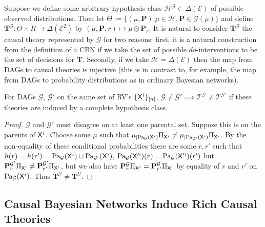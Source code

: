 Suppose we define some arbitrary hypothesis class $\mathscr{H}^{\mathcal{G}}\subset\Delta(\mathcal{E})$ of possible observed distributions. Then let $\Theta:=\{(\mu,\mathbf{P})|\mu\in\mathscr{H},\mathbf{P}\in \mathcal{G}(\mu)\}$ and define $\mathbf{T}^\mathscr{G}:\Theta\times R \to \Delta(\mathcal{E}^2)$ by $(\mu,\mathbf{P},r)\mapsto \mu\otimes \mathbf{P}_r$. It is natural to consider $\mathbf{T}^\mathscr{G}$ the causal theory represented by $\mathcal{G}$ for two reasons: first, it is a natural construction from the definition of a CBN if we take the set of possible $do$-interventions to be the set of decisions for $\mathbf{T}$. Secondly, if we take $\mathscr{H}=\Delta(\mathcal{E})$ then the map from DAGs to causal theories is injective (this is in contrast to, for example, the map from DAGs to probability distributions as in ordinary Bayesian networks\citep{bishop_pattern_2006}).

\begin{theorem}
For DAGs $\mathcal{G}$, $\mathcal{G}'$ on the same set of RV's $\{\mathsf{X}^i\}_{[n]}$, $\mathcal{G}\neq \mathcal{G}'\implies \mathscr{T}^{\mathcal{G}}\neq \mathscr{T}^{\mathcal{G}'}$ if these theories are induced by a complete hypothesis class.
\end{theorem}

\begin{proof}
$\mathcal{G}$ and $\mathcal{G}'$ must disagree on at least one parental set. Suppose this is on the parents of $\mathsf{X}^i$. Choose some $\mu$ such that $\mu_{|\text{Pa}_{\mathcal{G}}(\mathsf{X}^i)}\Pi_{\mathsf{X}^i} \neq  \mu_{|\text{Pa}_{\mathcal{G}'}(\mathsf{X}^i)}\Pi_{\mathsf{X}^i}$. By the non-equality of these conditional probabilities there are some $r,r'$ such that $h(r) = h(r') = \text{Pa}_{\mathcal{G}}(\mathsf{X}^i)\cup \text{Pa}_{\mathcal{G}'}(\mathsf{X}^i)$, $\text{Pa}_{\mathcal{G}}(\mathsf{X}'^i)(r) = \text{Pa}_{\mathcal{G}}(\mathsf{X}'^i)(r')$ but $\mathbf{P}^{\mathcal{G}'}_r \Pi_{\mathsf{X}^i} \neq \mathbf{P}^{\mathcal{G}'}_{r'} \Pi_{\mathsf{X}^i}$, but we also have $\mathbf{P}^{\mathcal{G}}_r \Pi_{\mathsf{X}^i} = \mathbf{P}^{\mathcal{G}}_{r'} \Pi_{\mathsf{X}^i}$ by equality of $r$ and $r'$ on $\text{Pa}_{\mathcal{G}}(\mathsf{X}^i)$. Thus $\mathbf{T}^\mathcal{G}\neq \mathbf{T}^\mathcal{G}$.
\end{proof}

\subsection{Causal Bayesian Networks Induce Rich Causal Theories}


